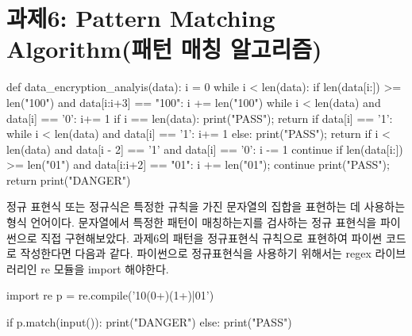 \documentclass{article}
\begin{document}
\section{과제6: Pattern Matching Algorithm(패턴 매칭 알고리즘)}
\begin{python}
	def data_encryption_analyis(data):
		i = 0
		while i < len(data):
			if len(data[i:]) >= len("100") and data[i:i+3] == "100":
				i += len("100")
				while i < len(data) and data[i] == '0': i+= 1
				if i == len(data): print("PASS"); return
				if data[i] == '1': 
					while i < len(data) and data[i] == '1': i+= 1
				else: print("PASS"); return
				if i < len(data) and 
							data[i - 2] == '1' and data[i] == '0': i -= 1
				continue
			if len(data[i:]) >= len("01") and data[i:i+2] == "01":
				i += len("01"); continue
			print("PASS"); return
		print("DANGER")
\end{python}
정규 표현식 또는 정규식은 특정한 규칙을 가진 문자열의 집합을 표현하는 데 사용하는 형식 언어이다.
문자열에서 특정한 패턴이 매칭하는지를 검사하는 정규 표현식을 파이썬으로 직접 구현해보았다.
과제6의 패턴을 정규표현식 규칙으로 표현하여 파이썬 코드로 작성한다면 다음과 같다. 파이썬으로
정규표현식을 사용하기 위해서는 regex 라이브러리인 re 모듈을 import 해야한다.

\begin{python}
	import re
	p = re.compile('10(0+)(1+)|01')

	if p.match(input()): print("DANGER")
	else: print("PASS")
\end{python}
\end{document}
